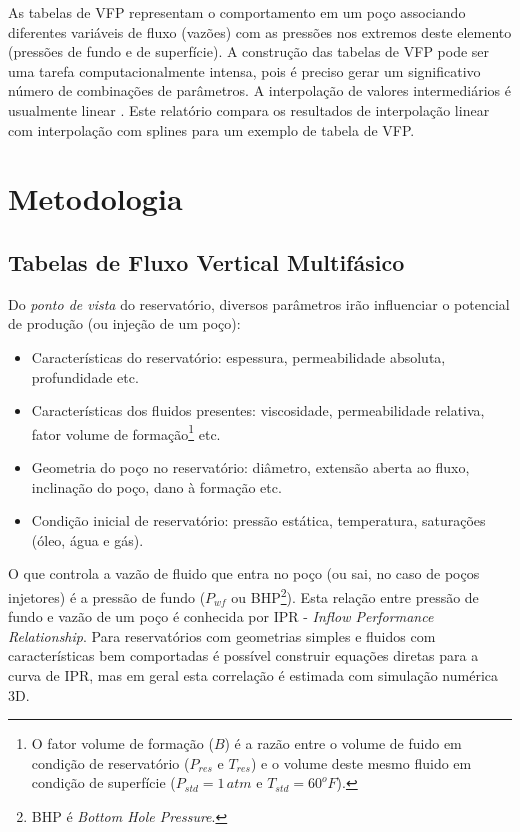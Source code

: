 \documentclass[final,5p]{elsarticle}
\numberwithin{equation}{section}
\begin{document}
    As tabelas de VFP representam o comportamento em um poço associando diferentes variáveis de fluxo (vazões) com as pressões nos extremos deste elemento (pressões de fundo e de superfície). A construção das tabelas de VFP pode ser uma tarefa computacionalmente intensa, pois é preciso gerar um significativo número de combinações de parâmetros. A interpolação de valores intermediários é usualmente linear \cite{computer2022cmg}\cite{schlumberger2009technical}. Este relatório compara os resultados de interpolação linear com interpolação com splines para um exemplo de tabela de VFP.

\section{Metodologia}

    \subsection{Tabelas de Fluxo Vertical Multifásico}

        Do \emph{ponto de vista} do reservatório, diversos parâmetros irão influenciar o potencial de produção (ou injeção de um poço):

        \begin{itemize}
            \item Características do reservatório: espessura, permeabilidade absoluta, profundidade etc.
            \item Características dos fluidos presentes: viscosidade, permeabilidade relativa, fator volume de formação\footnote{O fator volume de formação ($B$) é a razão entre o volume de fuido em condição de reservatório ($P_{res}$ e $T_{res}$) e o volume deste mesmo fluido em condição de superfície ($P_{std}=1 \, atm$ e $T_{std}=60^oF$).} etc.
            \item Geometria do poço no reservatório: diâmetro, extensão aberta ao fluxo, inclinação do poço, dano à formação etc.
            \item Condição inicial de reservatório: pressão estática, temperatura, saturações (óleo, água e gás).
        \end{itemize}
        
        O que controla a vazão de fluido que entra no poço (ou sai, no caso de poços injetores) é a pressão de fundo ($P_{wf}$ ou BHP\footnote{BHP é \emph{Bottom Hole Pressure}.}). Esta relação entre pressão de fundo e vazão de um poço é conhecida por IPR - \emph{Inflow Performance Relationship}. Para reservatórios com geometrias simples e fluidos com características bem comportadas é possível construir equações diretas para a curva de IPR, mas em geral esta correlação é estimada com simulação numérica 3D.
\end{document}
